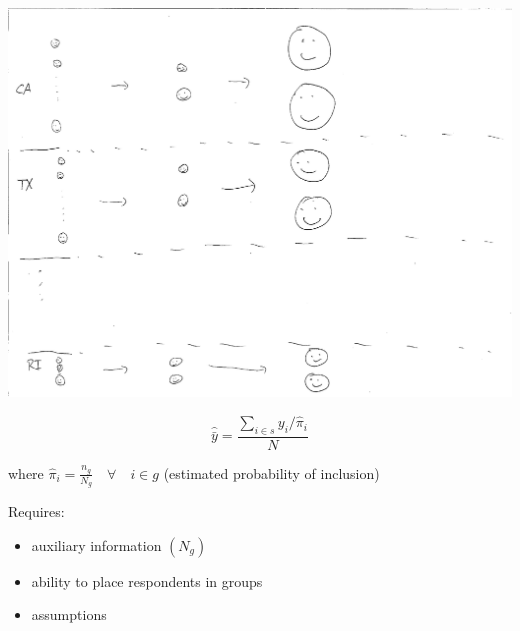 \documentclass[aspectratio=169]{beamer}
\begin{document}
\begin{frame}

\begin{center}
\includegraphics[height=\textheight]{figures/stratified_sampling_cps}
\end{center}

\end{frame}
\begin{frame}

\begin{equation*}
\hat{\bar{y}} = \frac{\sum_{i \in s} y_i / \hat{\pi}_i }{N}
\end{equation*}

where 
$\hat{\pi}_i = \frac{n_g}{N_g} \quad \forall \quad i \in g$ (estimated probability of inclusion)

\vfill

Requires:
\begin{itemize}
\item auxiliary information $(N_g)$
\item ability to place respondents in groups
\item assumptions
\end{itemize}

\end{frame}
\end{document}
